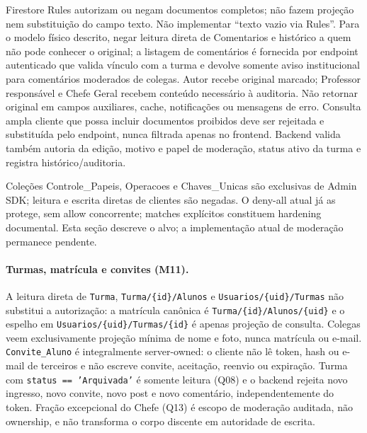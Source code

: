 Firestore Rules autorizam ou negam documentos completos; não fazem projeção nem substituição do campo texto. Não implementar ``texto vazio via Rules''. Para o modelo físico descrito, negar leitura direta de Comentarios e histórico a quem não pode conhecer o original; a listagem de comentários é fornecida por endpoint autenticado que valida vínculo com a turma e devolve somente aviso institucional para comentários moderados de colegas. Autor recebe original marcado; Professor responsável e Chefe Geral recebem conteúdo necessário à auditoria. Não retornar original em campos auxiliares, cache, notificações ou mensagens de erro. Consulta ampla cliente que possa incluir documentos proibidos deve ser rejeitada e substituída pelo endpoint, nunca filtrada apenas no frontend. Backend valida também autoria da edição, motivo e papel de moderação, status ativo da turma e registra histórico/auditoria.

Coleções Controle\_Papeis, Operacoes e Chaves\_Unicas são exclusivas de Admin SDK; leitura e escrita diretas de clientes são negadas. O deny-all atual já as protege, sem allow concorrente; matches explícitos constituem hardening documental. Esta seção descreve o alvo; a implementação atual de moderação permanece pendente.
\paragraph{Turmas, matrícula e convites (M11).}
A leitura direta de \texttt{Turma}, \texttt{Turma/\{id\}/Alunos} e
\texttt{Usuarios/\{uid\}/Turmas} não substitui a autorização: a matrícula
canônica é \texttt{Turma/\{id\}/Alunos/\{uid\}} e o espelho em
\texttt{Usuarios/\{uid\}/Turmas/\{id\}} é apenas projeção de consulta. Colegas
veem exclusivamente projeção mínima de nome e foto, nunca matrícula ou e-mail.
\texttt{Convite\_Aluno} é integralmente server-owned: o cliente não lê token,
hash ou e-mail de terceiros e não escreve convite, aceitação, reenvio ou
expiração. Turma com \texttt{status == 'Arquivada'} é somente leitura (Q08) e o
backend rejeita novo ingresso, novo convite, novo post e novo comentário,
independentemente do token. Fração excepcional do Chefe (Q13) é escopo de
moderação auditada, não ownership, e não transforma o corpo discente em
autoridade de escrita.

